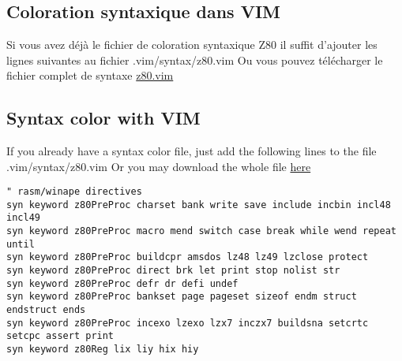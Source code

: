 
\section{}

\begin{xfr}
\subsection{Coloration syntaxique dans VIM}
  Si vous avez déjà le fichier de coloration syntaxique Z80 il suffit d'ajouter les lignes suivantes au fichier .vim/syntax/z80.vim
  Ou vous pouvez télécharger le fichier complet de syntaxe \href{http://www.roudoudou.com/rasm/z80.vim}{z80.vim}
\end{xfr}

\begin{xen}
\subsection{Syntax color with VIM}
  If you already have a syntax color file, just add the following lines to the file .vim/syntax/z80.vim
  Or you may download the whole file \href{http://www.roudoudou.com/rasm/z80.vim}{here}
\end{xen}

\begin{verbatim}
" rasm/winape directives
syn keyword z80PreProc charset bank write save include incbin incl48 incl49
syn keyword z80PreProc macro mend switch case break while wend repeat until
syn keyword z80PreProc buildcpr amsdos lz48 lz49 lzclose protect
syn keyword z80PreProc direct brk let print stop nolist str
syn keyword z80PreProc defr dr defi undef
syn keyword z80PreProc bankset page pageset sizeof endm struct endstruct ends
syn keyword z80PreProc incexo lzexo lzx7 inczx7 buildsna setcrtc setcpc assert print
syn keyword z80Reg lix liy hix hiy
\end{verbatim}
